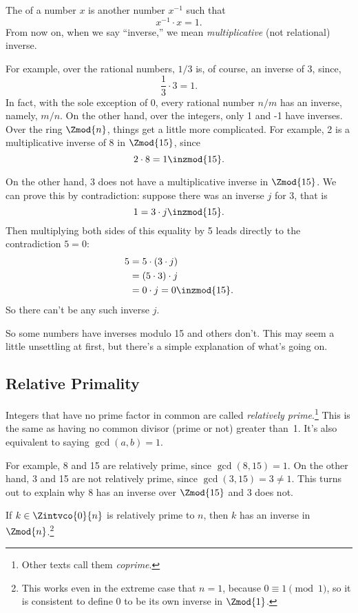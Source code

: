 
The  of a number $x$ is another number
$x^{-1}$ such that
\[
x^{-1} \cdot x  = 1.
\]
From now on, when we say ``inverse,'' we mean \emph{multiplicative}
(not relational) inverse.

For example, over the rational numbers, $1 / 3$ is, of course, an
inverse of 3, since,
\[
\frac{1}{3} \cdot 3 = 1.
\]
In fact, with the sole exception of 0, every rational number $n/m$ has
an inverse, namely, $m/n$.  On the other hand, over the integers, only
1 and -1 have inverses.  Over the ring
$\Zmod{n}$, things get a little more complicated.  For example, 2
  is a multiplicative inverse of 8 in $\Zmod{15}$, since
\[
2 \cdot 8 = 1 \inzmod{15}.
\]

On the other hand, 3 does not have a multiplicative inverse in
$\Zmod{15}$.  We can prove this by contradiction: suppose there was an
inverse $j$ for 3, that is
\[
1 = 3 \cdot j \inzmod{15}.
\]
Then multiplying both sides of this equality by 5 leads directly to
the contradiction $5 = 0$:
\begin{align*}
5 & = 5 \cdot (3 \cdot j)\\
  & = (5 \cdot 3) \cdot j\\
  & = 0 \cdot j = 0 \inzmod{15}.
\end{align*}
So there can't be any such inverse $j$.

So some numbers have inverses modulo 15 and others don't.  This may seem
a little unsettling at first, but there's a simple explanation of
what's going on.

\subsection{Relative Primality}

Integers that have no prime factor in common are called
\emph{relatively prime}.\footnote{Other texts call them
  \emph{coprime}.}  This is the same as having no common divisor
(prime or not) greater than~1.  It's also equivalent to saying
$\gcd(a, b) = 1$.

For example, 8 and 15 are relatively prime, since $\gcd(8, 15) = 1$.
On the other hand, 3 and 15 are not relatively prime, since $\gcd(3,
15) = 3 \neq 1$.  This turns out to explain why 8 has an inverse over
$\Zmod{15}$ and 3 does not.

\begin{lemma}\label{lem:inverse-arb} If $k \in \Zintvco{0}{n}$ is relatively prime to
$n$, then $k$ has an inverse in $\Zmod{n}$.\footnote{This works even
    in the extreme case that $n=1$, because $0 \equiv 1 \pmod{1}$, so
    it is consistent to define 0 to be its own inverse in $\Zmod{1}$.}
\end{lemma}

